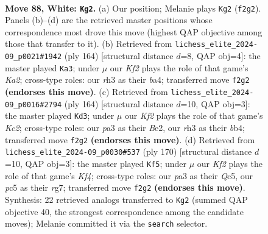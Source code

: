 \documentclass[11pt]{article}
\begin{document}
\clearpage

\begin{figure}[p]\centering
\begin{subfigure}{0.46\textwidth}\centering
\resizebox{\linewidth}{!}{%
\newchessgame
\chessboard[
  setfen={8/8/8/2p1k3/3p4/p6r/5K2/8 w - - 0 88},
  showmover=false,
  pgfstyle=straightmove, color=movearrow, markmove={f2-g2}
]}
\caption{}
\end{subfigure}\hfill
\begin{subfigure}{0.46\textwidth}\centering
\resizebox{\linewidth}{!}{%
\newchessgame
\chessboard[
  setfen={8/8/8/8/b1kp4/2p5/K7/8 w - - 6 83},
  showmover=false,
  pgfstyle=straightmove, color=movearrow, markmove={a2-a3}
]}
\caption{}
\end{subfigure}
\\[4pt]
\begin{subfigure}{0.46\textwidth}\centering
\resizebox{\linewidth}{!}{%
\newchessgame
\chessboard[
  setfen={8/8/8/8/1b3k2/4p3/2K1Bp2/8 w - - 0 83},
  showmover=false,
  pgfstyle=straightmove, color=movearrow, markmove={c2-d3}
]}
\caption{}
\end{subfigure}\hfill
\begin{subfigure}{0.46\textwidth}\centering
\resizebox{\linewidth}{!}{%
\newchessgame
\chessboard[
  setfen={4k3/5pr1/8/2Q5/5K2/8/8/8 w - - 13 86},
  showmover=false,
  pgfstyle=straightmove, color=movearrow, markmove={f4-f5}
]}
\caption{}
\end{subfigure}
\caption{\textbf{Move 88, White: \texttt{Kg2}.} (a) Our position; Melanie plays \texttt{Kg2} (\texttt{f2g2}). Panels (b)--(d) are the retrieved master positions whose correspondence most drove this move (highest QAP objective among those that transfer to it). (b) Retrieved from \texttt{lichess\_elite\_2024-09\_p0021\#1942} (ply 164) [structural distance $d$=8, QAP obj=4]: the master played \texttt{Ka3}; under $\mu$ our \emph{Kf2} plays the role of that game's \emph{Ka2}; cross-type roles: our \emph{r}h3 as their \emph{b}a4; transferred move \texttt{f2g2} \textbf{(endorses this move)}. (c) Retrieved from \texttt{lichess\_elite\_2024-09\_p0016\#2794} (ply 164) [structural distance $d$=10, QAP obj=3]: the master played \texttt{Kd3}; under $\mu$ our \emph{Kf2} plays the role of that game's \emph{Kc2}; cross-type roles: our \emph{p}a3 as their \emph{B}e2, our \emph{r}h3 as their \emph{b}b4; transferred move \texttt{f2g2} \textbf{(endorses this move)}. (d) Retrieved from \texttt{lichess\_elite\_2024-09\_p0030\#537} (ply 170) [structural distance $d$=10, QAP obj=3]: the master played \texttt{Kf5}; under $\mu$ our \emph{Kf2} plays the role of that game's \emph{Kf4}; cross-type roles: our \emph{p}a3 as their \emph{Q}c5, our \emph{p}c5 as their \emph{r}g7; transferred move \texttt{f2g2} \textbf{(endorses this move)}. Synthesis: 22 retrieved analogs transferred to \texttt{Kg2} (summed QAP objective 40, the strongest correspondence among the candidate moves); Melanie committed it via the \texttt{search} selector.}
\label{fig:thought-m174}
\end{figure}
\end{document}

